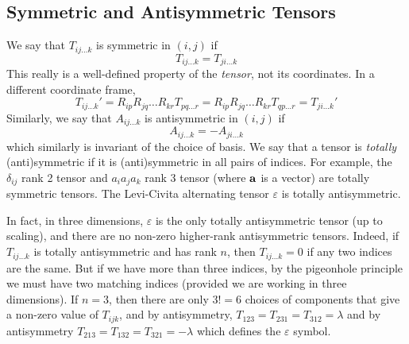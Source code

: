 \subsection{Symmetric and Antisymmetric Tensors}
We say that $T_{ij\dots k}$ is symmetric in $(i, j)$ if
\[ T_{ij\dots k} = T_{ji\dots k} \]
This really is a well-defined property of the \textit{tensor}, not its coordinates. In a different coordinate frame,
\[ T_{ij\dots k}' = R_{ip}R_{jq}\dots R_{kr} T_{pq\dots r} = R_{ip}R_{jq}\dots R_{kr} T_{qp\dots r} = T_{ji\dots k}' \]
Similarly, we say that $A_{ij\dots k}$ is antisymmetric in $(i, j)$ if
\[ A_{ij\dots k} = -A_{ji\dots k} \]
which similarly is invariant of the choice of basis. We say that a tensor is \textit{totally} (anti)symmetric if it is (anti)symmetric in all pairs of indices. For example, the $\delta_{ij}$ rank 2 tensor and $a_ia_ja_k$ rank 3 tensor (where $\vb a$ is a vector) are totally symmetric tensors. The Levi-Civita alternating tensor $\varepsilon$ is totally antisymmetric.

In fact, in three dimensions, $\varepsilon$ is the only totally antisymmetric tensor (up to scaling), and there are no non-zero higher-rank antisymmetric tensors. Indeed, if $T_{ij\dots k}$ is totally antisymmetric and has rank $n$, then $T_{ij\dots k} = 0$ if any two indices are the same. But if we have more than three indices, by the pigeonhole principle we must have two matching indices (provided we are working in three dimensions). If $n=3$, then there are only $3! = 6$ choices of components that give a non-zero value of $T_{ijk}$, and by antisymmetry, $T_{123} = T_{231} = T_{312} = \lambda$ and by antisymmetry $T_{213} = T_{132} = T_{321} = -\lambda$ which defines the $\varepsilon$ symbol.

